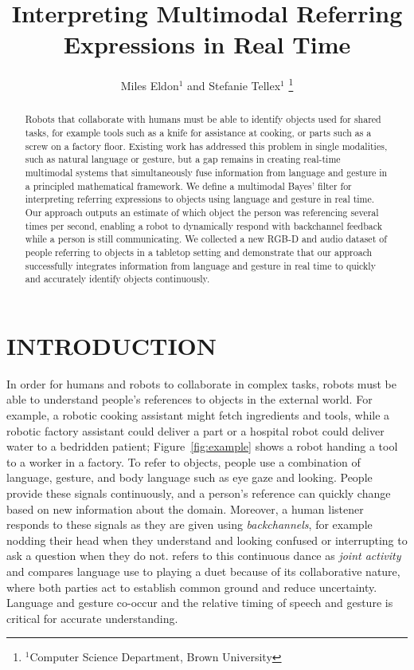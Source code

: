 \documentclass[letterpaper, 10 pt, conference]{ieeeconf}
\title{\LARGE \bf
Interpreting Multimodal Referring Expressions in Real Time}
\author{Miles Eldon$^{1}$ and Stefanie Tellex$^{1}$
\thanks{$^{1}$Computer Science Department, Brown University}
}
\begin{document}
\maketitle
\thispagestyle{empty}
\pagestyle{empty}

\begin{abstract}
Robots that collaborate with humans must be able to identify objects
used for shared tasks, for example tools such as a knife for
assistance at cooking, or parts such as a screw on a factory floor.
Existing work has addressed this problem in single modalities, such as
natural language or gesture, but a gap remains in creating real-time
multimodal systems that simultaneously fuse information from language
and gesture in a principled mathematical framework.  We define a
multimodal Bayes' filter for interpreting referring expressions to
objects using language and gesture in real time.  Our approach outputs
an estimate of which object the person was referencing several times
per second, enabling a robot to dynamically respond with backchannel
feedback while a person is still communicating.  We collected a new
RGB-D and audio dataset of people referring to objects in a tabletop
setting and demonstrate that our approach successfully integrates
information from language and gesture in real time to quickly and
accurately identify objects continuously.  
\end{abstract}

\section{INTRODUCTION}

In order for humans and robots to collaborate in complex tasks, robots
must be able to understand people's references to objects in the
external world.  For example, a robotic cooking assistant might fetch
ingredients and tools, while a robotic factory assistant could deliver
a part or a hospital robot could deliver water to a bedridden patient;
Figure~\ref{fig:example} shows a robot handing a tool to a worker in a
factory.  To refer to objects, people use a combination of language,
gesture, and body language such as eye gaze and looking.  People
provide these signals continuously, and a person's reference can
quickly change based on new information about the domain.  Moreover, a
human listener responds to these signals as they are given using {\em
  backchannels}, for example nodding their head when they understand
and looking confused or interrupting to ask a question when they do
not.  \citet{clark96} refers to this continuous dance as {\em joint
  activity} and compares language use to playing a duet because of its
collaborative nature, where both parties act to establish common
ground and reduce uncertainty.  Language and gesture co-occur and the
relative timing of speech and gesture is critical for accurate
understanding.
\end{document}
